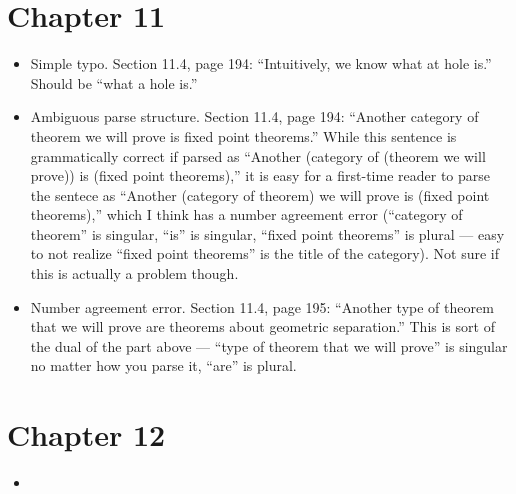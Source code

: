 \documentclass{fkletter}
\begin{document}
\section*{Chapter 11}
\begin{itemize}
  \item Simple typo. Section 11.4, page 194: ``Intuitively, we know what
    {\color{red} at} hole is.'' Should be ``what {\color{green} a} hole is.''
  \item Ambiguous parse structure. Section 11.4, page 194: ``Another category of
    theorem we will prove is fixed point theorems.'' While this sentence is
    grammatically correct if parsed as ``Another (category of (theorem we will
    prove)) is (fixed point theorems),'' it is easy for a first-time reader to
    parse the sentece as ``Another (category of theorem) we will prove is (fixed
    point theorems),'' which I think has a number agreement error (``category of
    theorem'' is singular, ``is'' is singular, ``fixed point theorems'' is
    plural --- easy to not realize ``fixed point theorems'' is the title of the
    category). Not sure if this is actually a problem though.
  \item Number agreement error. Section 11.4, page 195: ``Another type of
    theorem that we will prove {\color{red} are} theorems about geometric
    separation.'' This is sort of the dual of the part above --- ``type of
    theorem that we will prove'' is singular no matter how you parse it, ``are''
    is plural.
\end{itemize}
\section*{Chapter 12}
\begin{itemize}
  \item
\end{itemize}
\end{document}
